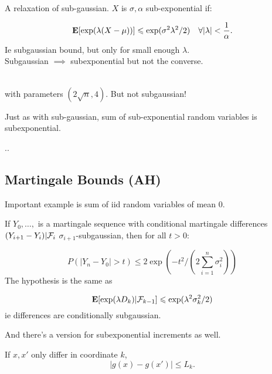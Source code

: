 \documentclass{article}
\begin{document}
\begin{definition}
A relaxation of sub-gaussian. $X$ is $\sigma,\alpha$ sub-exponential if:

$$\mathbf{E}[\exp(\lambda(X-\mu))] \leqslant \exp(\sigma^2 \lambda^2/2) \quad \forall |\lambda|<\frac{1}{\alpha}.$$
Ie subgaussian bound, but only for small enough $\lambda$. \\

Subgaussian $\implies$ subexponential but not the converse. \\\\
\end{definition}

\begin{fact}

\end{fact}

\begin{example}
with parameters $(2\sqrt{n},4)$. But not subgaussian! 

\end{example}
Just as with sub-gaussian, sum of sub-exponential random variables is subexponential. 
\begin{theorem}
..
\end{theorem}



\subsection{Martingale Bounds (AH)}
Important example is sum of iid random variables of mean $0$. 

\begin{theorem}
If $Y_0,\ldots,$ is a martingale sequence with conditional martingale differences $(Y_{i+1} - Y_i)|\mathcal F_i$ $\sigma_{i+1}$-subgaussian, then for all $t>0$:

$$\boxed{P(|Y_n - Y_0| >t) \leq 2\exp(-t^2/(2\sum_{i=1}^n \sigma_i^2))}$$
The hypothesis is the same as 

$$\mathbf{E}[\exp(\lambda D_k)|\mathcal F_{k-1}] \leqslant \exp(\lambda^2 \sigma_k^2 / 2)$$
ie differences are conditionally subgaussian. 

\end{theorem}

And there's a version for subexponential increments as well. 


\begin{definition}
If $x, x'$ only differ in coordinate $k$, 
$$|g(x) - g(x') | \leq L_k.$$ 
\end{definition}
\end{document}
